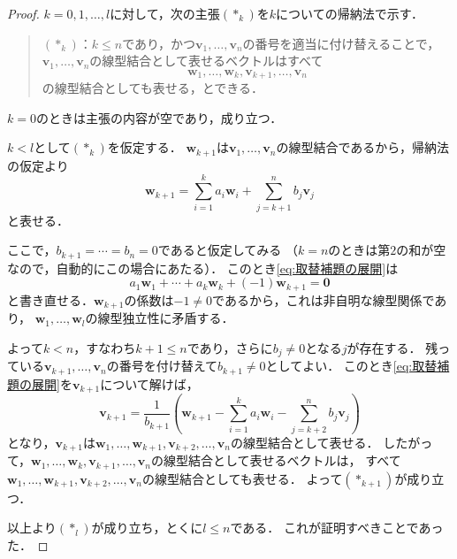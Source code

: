 \begin{leftbar}
\begin{proof}
  $k = 0, 1, \dots, l$に対して，次の主張$(\ast_k)$を$k$についての帰納法で示す．

  \begin{quote}
    $(\ast_k)$：$k \le n$であり，かつ$\bm{v}_1, \dots, \bm{v}_n$の番号を適当に付け替えることで，
    $\bm{v}_1, \dots, \bm{v}_n$の線型結合として表せるベクトルはすべて
    \[
      \bm{w}_1, \dots, \bm{w}_k, \bm{v}_{k+1}, \dots, \bm{v}_n
    \]
    の線型結合としても表せる，とできる．
  \end{quote}

  $k = 0$のときは主張の内容が空であり，成り立つ．

  $k < l$として$(\ast_k)$を仮定する．
  $\bm{w}_{k+1}$は$\bm{v}_1, \dots, \bm{v}_n$の線型結合であるから，帰納法の仮定より
  \begin{equation}
    \bm{w}_{k+1}
    = \sum_{i=1}^{k} a_i \bm{w}_i + \sum_{j=k+1}^{n} b_j \bm{v}_j
    \label{eq:取替補題の展開}
  \end{equation}
  と表せる．

  ここで，$b_{k+1} = \cdots = b_n = 0$であると仮定してみる
  （$k = n$のときは第$2$の和が空なので，自動的にこの場合にあたる）．
  このとき\eqref{eq:取替補題の展開}は
  \[
    a_1 \bm{w}_1 + \cdots + a_k \bm{w}_k + (-1)\bm{w}_{k+1} = \bm{0}
  \]
  と書き直せる．$\bm{w}_{k+1}$の係数は$-1 \ne 0$であるから，これは非自明な線型関係であり，
  $\bm{w}_1, \dots, \bm{w}_l$の線型独立性に矛盾する．

  よって$k < n$，すなわち$k + 1 \le n$であり，さらに$b_j \ne 0$となる$j$が存在する．
  残っている$\bm{v}_{k+1}, \dots, \bm{v}_n$の番号を付け替えて$b_{k+1} \ne 0$としてよい．
  このとき\eqref{eq:取替補題の展開}を$\bm{v}_{k+1}$について解けば，
  \[
    \bm{v}_{k+1}
    = \frac{1}{b_{k+1}}\left( \bm{w}_{k+1} - \sum_{i=1}^{k} a_i \bm{w}_i - \sum_{j=k+2}^{n} b_j \bm{v}_j \right)
  \]
  となり，$\bm{v}_{k+1}$は$\bm{w}_1, \dots, \bm{w}_{k+1}, \bm{v}_{k+2}, \dots, \bm{v}_n$の線型結合として表せる．
  したがって，$\bm{w}_1, \dots, \bm{w}_k, \bm{v}_{k+1}, \dots, \bm{v}_n$の線型結合として表せるベクトルは，
  すべて$\bm{w}_1, \dots, \bm{w}_{k+1}, \bm{v}_{k+2}, \dots, \bm{v}_n$の線型結合としても表せる．
  よって$(\ast_{k+1})$が成り立つ．

  以上より$(\ast_l)$が成り立ち，とくに$l \le n$である．
  これが証明すべきことであった．
\end{proof}
\end{leftbar}

